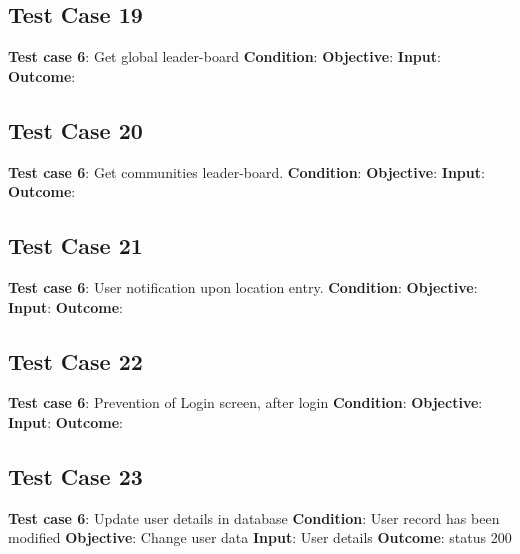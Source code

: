 \documentclass[11pt]{article}
\begin{document}
\subsection{Test Case 19}
\textbf{Test case 6}: Get global leader-board \newline
\textbf{Condition}:  \newline
\textbf{Objective}:   \newline
\textbf{Input}:  \newline
\textbf{Outcome}:   \newline

\subsection{Test Case 20}
\textbf{Test case 6}: Get communities leader-board. \newline
\textbf{Condition}:  \newline
\textbf{Objective}:   \newline
\textbf{Input}:  \newline
\textbf{Outcome}:   \newline

\subsection{Test Case 21}
\textbf{Test case 6}: User notification upon location entry. \newline
\textbf{Condition}:  \newline
\textbf{Objective}:   \newline
\textbf{Input}:  \newline
\textbf{Outcome}:   \newline

\subsection{Test Case 22}
\textbf{Test case 6}: Prevention of Login screen, after login  \newline
\textbf{Condition}:  \newline
\textbf{Objective}:   \newline
\textbf{Input}:  \newline
\textbf{Outcome}:   \newline

\subsection{Test Case 23}
\textbf{Test case 6}: Update user details in database  \newline
\textbf{Condition}: User record has been modified \newline
\textbf{Objective}: Change user data  \newline
\textbf{Input}: User details \newline
\textbf{Outcome}:  status 200 \newline
\end{document}
